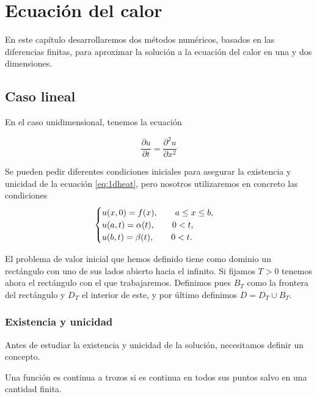 \chapter{Ecuación del calor}
\label{cap:heat}
\begin{resumen}
	En este capítulo desarrollaremos dos métodos numéricos, basados en las diferencias finitas, para aproximar la solución a la ecuación del calor en una  y dos dimensiones.
\end{resumen}

\section{Caso lineal}
En el caso unidimensional, tenemos la ecuación

\begin{equation}\label{eq:1dheat}
	\frac{\partial u}{\partial t} = \frac{\partial ^2u}{\partial x^2}
\end{equation}

Se pueden pedir diferentes condiciones iniciales para asegurar la existencia y unicidad de la ecuación \ref{eq:1dheat}, pero nosotros utilizaremos en concreto las condiciones
\begin{equation}
	\begin{cases}
			u(x,0)=f(x), \hspace{20px} a\leq x \leq b, \\
			u(a,t)=\alpha(t), \hspace{20px} 0<t, \\
			u(b,t)=\beta(t), \hspace{20px} 0<t.
	\end{cases}
\end{equation}

El problema de valor inicial que hemos definido tiene como dominio un rectángulo con uno de sus lados abierto hacia el infinito. Si fijamos $T>0$ tenemos ahora el rectángulo con el que trabajaremos. Definimos pues $B_T$ como la frontera del rectángulo y $D_T$ el interior de este, y por último definimos $D=D_T\cup B_T$.

\subsection{Existencia y unicidad}

Antes de estudiar la existencia y unicidad de la solución, necesitamos definir un concepto.
\begin{definicion}
	Una función es continua a trozos si es continua en todos sus puntos salvo en una cantidad finita.
\end{definicion}

